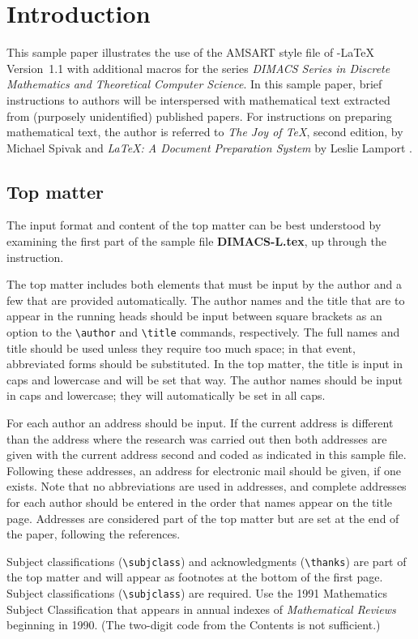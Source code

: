 \section{Introduction}

This sample paper illustrates the use of the AMSART style file of
\AmS-\LaTeX{} Version~1.1 with additional macros for the series {\it
DIMACS Series in Discrete Mathematics and Theoretical Computer Science}.
In this sample paper, brief instructions to authors will be interspersed
with mathematical text extracted from (purposely unidentified) published
papers.  For instructions on preparing mathematical text, the author is
referred to {\it The Joy of \TeX}, second edition, by Michael Spivak
\cite{spivak:jot} and {\it \LaTeX{}: A Document Preparation System} by
Leslie Lamport \cite{lamport:latex}.

\subsection{Top matter}
The input format and content of the top matter can be best understood
by examining the first part of the sample file {\bf DIMACS-L.tex}, up
through the \verb++ instruction.

The top matter includes both elements that must be input by the author and a
few that are provided automatically.  The author names and the title that are
to appear in the running heads should be input between square brackets as an
option to the \verb+\author+ and \verb+\title+ commands, respectively. The full
names and title should be used unless they require too much space; in that
event, abbreviated forms should be substituted. In the top matter, the title is
input in caps and lowercase and will be set that way.  The author names should
be input in caps and lowercase; they will automatically be set in all caps.

For each author an address should be input.  If the current address is
different than the address where the research was carried out then both
addresses are given with the current address second and coded as indicated
in this sample file.   Following these addresses, an
address for electronic mail should be given, if one exists. Note that no
abbreviations are used in addresses, and complete addresses for each author
should be entered in the order that names appear on the title page.  Addresses
are considered part of the top matter but are set at the end of the paper,
following the references.

Subject classifications (\verb+\subjclass+) and acknowledgments
(\verb+\thanks+) are part of the top matter and will appear as footnotes at the
bottom of the first page.  Subject classifications
(\verb+\subjclass+) are required.  Use the 1991 Mathematics Subject Classification
that appears in annual indexes of {\it Mathematical Reviews\/}
beginning in 1990.  (The two-digit code from the Contents is not sufficient.)

